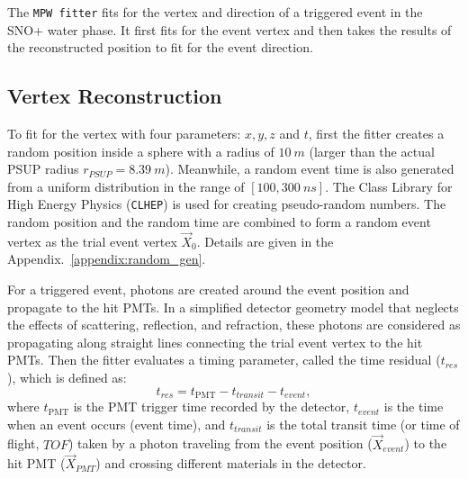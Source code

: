 The \texttt{MPW fitter} fits for the vertex and direction of a triggered event in the SNO+ water phase. It first fits for the event vertex and then takes the results of the reconstructed position to fit for the event direction.

\subsection{Vertex Reconstruction}\label{sect:waterVertex}

To fit for the vertex with four parameters: $x,y,z$ and $t$, first the fitter creates a random position inside a sphere with a radius of $10~m$ (larger than the actual PSUP radius $r_{PSUP}=8.39~m$). Meanwhile, a random event time is also generated from a uniform distribution in the range of $[100,300~ns]$. The Class Library for High Energy Physics (\texttt{CLHEP}) is used for creating pseudo-random numbers. The random position and the random time are combined to form a random event vertex as the trial event vertex $\vec{X}_0$. Details are given in the Appendix.~\ref{appendix:random_gen}.

For a triggered event, photons are created around the event position and propagate to the hit PMTs. In a simplified detector geometry model that neglects the effects of scattering, reflection, and refraction, these photons are considered as propagating along straight lines connecting the trial event vertex to the hit PMTs. Then the fitter evaluates a timing parameter, called the time residual ($t_{res}$), which is defined as:
\begin{equation}
\label{eq:tres_define}
t_{res}=t_\mathrm{PMT} - t_{transit} - t_{event},
\end{equation}
where $t_\mathrm{PMT}$ is the PMT trigger time recorded by the detector, $t_{event}$ is the time when an event occurs (event time), and $t_{transit}$ is the total transit time (or time of flight, $TOF$) taken by a photon traveling from the event position ($\vec{X}_{event}$) to the hit PMT ($\vec{X}_{PMT}$) and crossing different materials in the detector.

